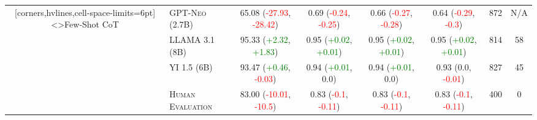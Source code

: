 \documentclass[twocolumn]{article}
\begin{document}
\begin{sidewaystable}[ht]
\begin{NiceTabular}{cl*{6}{c}}[corners,hvlines,cell-space-limits=6pt]
<\rotate>{Few-Shot CoT}
	 & \textsc{GPT-Neo (2.7B)} & 65.08 (\textcolor{Red}{-27.93}, \textcolor{Red}{-28.42}) & 0.69 (\textcolor{Red}{-0.24}, \textcolor{Red}{-0.25}) & 0.66 (\textcolor{Red}{-0.27}, \textcolor{Red}{-0.28}) & 0.64 (\textcolor{Red}{-0.29}, \textcolor{Red}{-0.3}) & 872 & N/A \\
	 & \textsc{LLAMA 3.1 (8B)} & 95.33 (\textcolor{Green}{+2.32}, \textcolor{Green}{+1.83}) & 0.95 (\textcolor{Green}{+0.02}, \textcolor{Green}{+0.01}) & 0.95 (\textcolor{Green}{+0.02}, \textcolor{Green}{+0.01}) & 0.95 (\textcolor{Green}{+0.02}, \textcolor{Green}{+0.01}) & 814 & 58 \\
	 & \textsc{YI 1.5 (6B)} & 93.47 (\textcolor{Green}{+0.46}, \textcolor{Red}{-0.03}) & 0.94 (\textcolor{Green}{+0.01}, 0.0) & 0.94 (\textcolor{Green}{+0.01}, 0.0) & 0.93 (0.0, \textcolor{Red}{-0.01}) & 827 & 45 \\

	 & \textsc{Human Evaluation} & 83.00 (\textcolor{Red}{-10.01}, \textcolor{Red}{-10.5}) & 0.83 (\textcolor{Red}{-0.1}, \textcolor{Red}{-0.11}) & 0.83 (\textcolor{Red}{-0.1}, \textcolor{Red}{-0.11}) & 0.83 (\textcolor{Red}{-0.1}, \textcolor{Red}{-0.11}) & 400 & 0 \\

\end{NiceTabular}
\end{sidewaystable}
\end{document}
